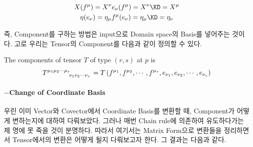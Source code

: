 \documentclass[paper=a4, fontsize=11pt]{scrartcl} %
\numberwithin{equation}{section} %
\numberwithin{figure}{section} %
\numberwithin{table}{section} %
\theoremstyle{plain}
\newcommand{\VS}{\vspace{0.3cm}}
\newcommand{\BKS}[1]{\left( #1 \right)}
\begin{document}
\begin{gather*}
 X(f^{\mu}) = X^{\nu}e_{\nu}(f^{\mu}) = X^{\nu} \KD = X^{\mu} \\
 \eta(e_{\nu}) = \eta_{\mu} f^{\mu}(e_{\nu}) = \eta_{\mu} \KD = \eta_{\nu}
\end{gather*}

즉, Component를 구하는 방법은 input으로 Domain space의 Basis를 넣어주는 것이다. 고로 우리는 Tensor의 Component를 다음과 같이 정의할 수 있다.


\begin{defn}
 The components of tensor $T$ of type $(r,s)$ at $p$ is
 \begin{equation*}
  \tensor{T}{^{\mu_1}^{\mu_2}^{\cdots}^{\mu_r}_{\nu_1}_{\nu_2}_{\cdots}_{\nu_s}} = T \BKS{f^{\mu_1},f^{\mu_2},\cdots,f^{\mu_r},e_{\nu_1},e_{\nu_2},\cdots,e_{\nu_s}}
 \end{equation*}

\end{defn}

\VS

\paragraph{$-$Change of Coordinate Basis}

우린 이미 Vector와 Covector에서 Coordinate Basis를 변환할 때, Component가 어떻게 변하는지에 대하여 다뤄보았다. 그러나 매번 Chain rule에 의존하여 유도하다가는
제 명에 못 죽을 것이 분명하다. 따라서 여기서는 Matrix Form으로 변환들을 정리하면서 Tensor에서의 변환은 어떻게 될지 다뤄보고자 한다. 그 결과는 다음과 같다.

\VS
\end{document}
